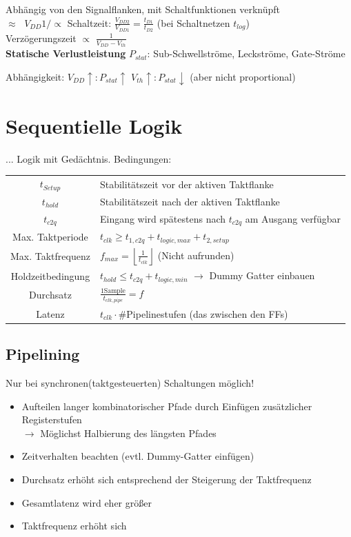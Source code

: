 \documentclass[6pt,a4paper]{scrartcl}
\renewcommand{\emph}[1]{\textsf{\textbf{#1}}}
\newcommand{\ra}[0]{\ensuremath{\rightarrow}} 									%
\begin{document}
\begin{multicols}{3}
	Abhängig von den Signalflanken, mit Schaltfunktionen verknüpft\\ 
	$\approx \;$ $V_{DD} 1/\propto $ Schaltzeit: $\frac{V_{DD2}}{V_{DD1}} = \frac{t_{D1}}{t_{D2}}$ (bei Schaltnetzen $t_{log}$)\\
	Verzögerungszeit $\propto$ $\frac{1}{V_{DD} - V_{th}}$\\

	\emph{Statische Verlustleistung} $P_{stat}$: Sub-Schwellströme, Leckströme, Gate-Ströme
	
	Abhängigkeit: $V_{DD}\uparrow:P_{stat}\uparrow$ \qquad $V_{th}\uparrow:P_{stat}\downarrow$ \quad (aber nicht proportional)\\


\section{Sequentielle Logik}
... Logik mit Gedächtnis. Bedingungen: \\
\begin{tabular}{c | l}
$t_{Setup}$ & Stabilitätszeit vor der aktiven Taktflanke\\
$t_{hold}$ & Stabilitätszeit nach  der aktiven Taktflanke\\
$t_{c2q}$ & Eingang wird spätestens nach $t_{c2q}$ am Ausgang verfügbar\\
Max. Taktperiode &  $t_{clk} \ge t_{1,c2q} + t_{logic,max} + t_{2,setup}$  \\
 Max. Taktfrequenz & $f_{max} = \left\lfloor \frac{1}{t_{clk}} \right\rfloor$ \qquad (Nicht aufrunden) \\
 Holdzeitbedingung & $t_{hold} \le t_{c2q} + t_{logic,min}$  $\ra$ Dummy Gatter einbauen\\
 Durchsatz & $\frac{1 \text{Sample}}{t_{clk,pipe}} = f$ \\
 Latenz & $t_{clk} \cdot \#$Pipelinestufen (das zwischen den FFs) \\
\end{tabular}


\subsection{Pipelining} %
Nur bei synchronen(taktgesteuerten) Schaltungen möglich!
\begin{itemize} \itemsep0pt
	\item Aufteilen langer kombinatorischer Pfade durch Einfügen zusätzlicher Registerstufen\\
	$\ra$ Möglichst Halbierung des längsten Pfades
	\item Zeitverhalten beachten (evtl. Dummy-Gatter einfügen)
	\item Durchsatz erhöht sich entsprechend der Steigerung der Taktfrequenz
	\item Gesamtlatenz wird eher größer
	\item Taktfrequenz erhöht sich
\end{itemize}


\end{multicols}
\end{document}
